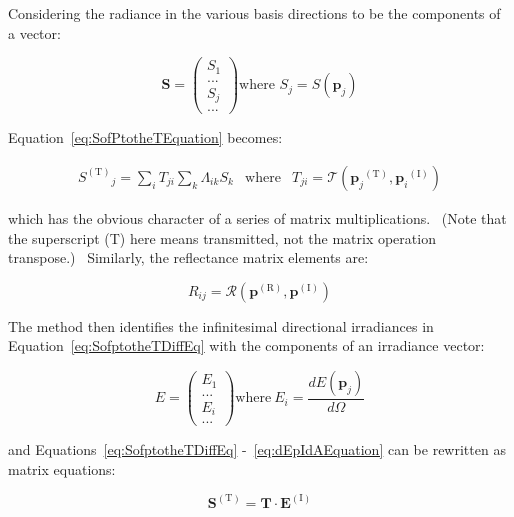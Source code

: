 Considering the radiance in the various basis directions to be the components of a vector:

\begin{equation}
\mathbf{S} = \left(
    \begin{array}{c}
      S_1 \\ ... \\ S_j \\ ...
    \end{array}
  \right)
  \text{where~}
  S_j = S(\mathbf{p}_j)
\end{equation}

Equation~\ref{eq:SofPtotheTEquation} becomes:

\begin{equation}
\begin{array}{ccc}{{S^{{\mathrm{(T)}}}}_j = \sum\limits_i {{T_{ji}}} \sum\limits_k {{\Lambda_{ik}}} {S_k}}&{{\mathrm{where}}}&{{T_{ji}} = {\mathcal{T}} ({{\mathbf{p}}_j}^{{\mathrm{(T)}}},{{\mathbf{p}}_i}^{{\mathrm{(I)}}})}\end{array}
\end{equation}

which has the obvious character of a series of matrix multiplications.~ (Note that the superscript (T) here means transmitted, not the matrix operation transpose.)~ Similarly, the reflectance matrix elements are:

\begin{equation}
{R_{ij}} = {\mathcal{R}} ({{\mathbf{p}}^{{\mathrm{(R)}}}},{{\mathbf{p}}^{{\mathrm{(I)}}}})
\label{eq:RijEquation}
\end{equation}

The method then identifies the infinitesimal directional irradiances in Equation~\ref{eq:SofptotheTDiffEq} with the components of an irradiance vector:

\begin{equation}
E = \left(
    \begin{array}{c}
      E_1 \\ ... \\ E_i \\ ...
    \end{array}
  \right)
  \text{where}
  ~E_i = \frac{dE(\mathbf{p}_j)}{d\Omega}
\end{equation}

and Equations~\ref{eq:SofptotheTDiffEq} -~\ref{eq:dEpIdAEquation} can be rewritten as matrix equations:

\begin{equation}
{{\mathbf{S}}^{{\mathrm{(T)}}}} = {\mathbf{T}} \cdot {{\mathbf{E}}^{{\mathrm{(I)}}}}
\end{equation}

